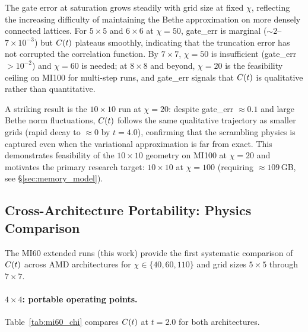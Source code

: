The gate error at saturation grows steadily with grid size at fixed $\chi$,
reflecting the increasing difficulty of maintaining the Bethe approximation
on more densely connected lattices.
For $5\times5$ and $6\times6$ at $\chi=50$, gate\_err is marginal
($\sim 2$--$7\times10^{-3}$) but $C(t)$ plateaus smoothly, indicating that
the truncation error has not corrupted the correlation function.
By $7\times7$, $\chi=50$ is insufficient (gate\_err $> 10^{-2}$) and $\chi=60$
is needed; at $8\times8$ and beyond, $\chi=20$ is the feasibility ceiling on
MI100 for multi-step runs, and gate\_err signals that $C(t)$ is qualitative rather
than quantitative.

A striking result is the $10\times10$ run at $\chi=20$:
despite gate\_err $\approx 0.1$ and large Bethe norm fluctuations,
$C(t)$ follows the same qualitative trajectory as smaller grids
(rapid decay to $\approx 0$ by $t = 4.0$), confirming that the scrambling
physics is captured even when the variational approximation is far from exact.
This demonstrates feasibility of the $10\times10$ geometry on MI100 at $\chi=20$
and motivates the primary research target: $10\times10$ at $\chi=100$
(requiring $\approx109$\,GB, see §\ref{sec:memory_model}).

\subsection{Cross-Architecture Portability: Physics Comparison}
\label{sec:portability_physics}

The MI60 extended runs (this work) provide the first systematic comparison of
$C(t)$ across AMD architectures for $\chi \in \{40, 60, 110\}$ and grid sizes
$5\times5$ through $7\times7$.

\paragraph{$4\times4$: portable operating points.}
Table~\ref{tab:mi60_chi} compares $C(t)$ at $t=2.0$ for both architectures.

